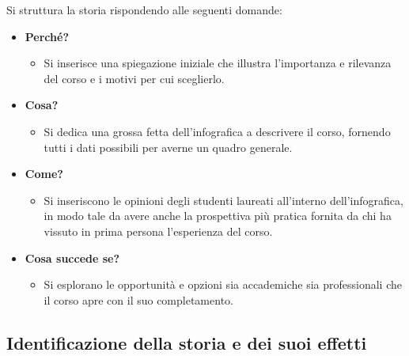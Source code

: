 \bigskip
\noindent Si struttura la storia rispondendo alle seguenti domande:
\begin{itemize}
    \item \textbf{Perché?}
    \begin{itemize}
        \item Si inserisce una spiegazione iniziale che illustra l'importanza e rilevanza del corso e i motivi per cui sceglierlo.
    \end{itemize}
    \item \textbf{Cosa?}
    \begin{itemize}
        \item Si dedica una grossa fetta dell'infografica a descrivere il corso, fornendo tutti i dati possibili per averne un quadro generale.
    \end{itemize}
    \item \textbf{Come?}
    \begin{itemize}
        \item Si inseriscono le opinioni degli studenti laureati all'interno dell'infografica, in modo tale da avere anche la prospettiva più pratica fornita
        da chi ha vissuto in prima persona l'esperienza del corso.
    \end{itemize}
    \item \textbf{Cosa succede se?}
    \begin{itemize}
        \item Si esplorano le opportunità e opzioni sia accademiche sia professionali che il corso apre con il suo completamento.
    \end{itemize}
\end{itemize}


\subsection{Identificazione della storia e dei suoi effetti}
